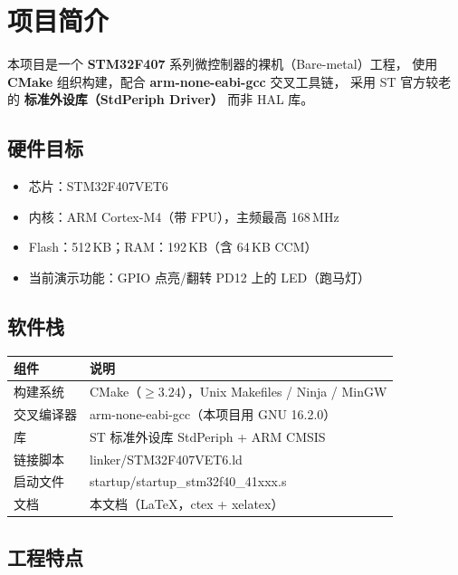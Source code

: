 \section{项目简介}

本项目是一个 \textbf{STM32F407} 系列微控制器的裸机（Bare-metal）工程，
使用 \textbf{CMake} 组织构建，配合 \textbf{arm-none-eabi-gcc} 交叉工具链，
采用 ST 官方较老的 \textbf{标准外设库（StdPeriph Driver）} 而非 HAL 库。

\subsection{硬件目标}

\begin{itemize}
  \item 芯片：STM32F407VET6
  \item 内核：ARM Cortex-M4（带 FPU），主频最高 168\,MHz
  \item Flash：512\,KB；RAM：192\,KB（含 64\,KB CCM）
  \item 当前演示功能：GPIO 点亮/翻转 PD12 上的 LED（跑马灯）
\end{itemize}

\subsection{软件栈}

\begin{table}[h]
  \centering
  \begin{tabular}{ll}
    \toprule
    组件 & 说明 \\
    \midrule
    构建系统 & CMake（$\geq 3.24$），Unix Makefiles / Ninja / MinGW \\
    交叉编译器 & arm-none-eabi-gcc（本项目用 GNU 16.2.0） \\
    库 & ST 标准外设库 StdPeriph + ARM CMSIS \\
    链接脚本 & linker/STM32F407VET6.ld \\
    启动文件 & startup/startup\_stm32f40\_41xxx.s \\
    文档 & 本文档（LaTeX，ctex + xelatex） \\
    \bottomrule
  \end{tabular}
\end{table}

\subsection{工程特点}

